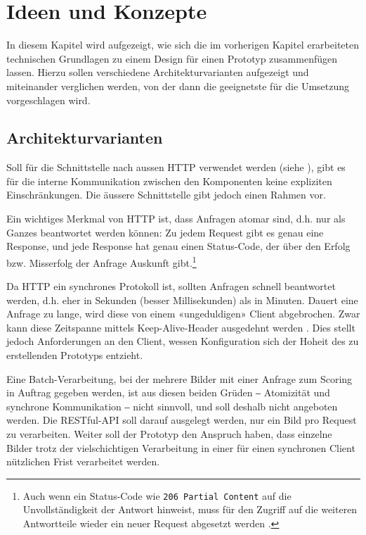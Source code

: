 \section{Ideen und Konzepte}
\label{sec:ideen-und-konzepte}

In diesem Kapitel wird aufgezeigt, wie sich die im vorherigen Kapitel erarbeiteten technischen Grundlagen zu einem Design für einen Prototyp zusammenfügen lassen. Hierzu sollen verschiedene Architekturvarianten aufgezeigt und miteinander verglichen werden, von der dann die geeignetste für die Umsetzung vorgeschlagen wird.

\subsection{Architekturvarianten}
\label{sec:architekturvarianten}

Soll für die Schnittstelle nach aussen HTTP verwendet werden (siehe ), gibt es für die interne Kommunikation zwischen den Komponenten keine expliziten Einschränkungen. Die äussere Schnittstelle gibt jedoch einen Rahmen vor.

Ein wichtiges Merkmal von HTTP ist, dass Anfragen atomar sind, d.h. nur als Ganzes beantwortet werden können: Zu jedem Request gibt es genau eine Response, und jede Response hat genau einen Status-Code, der über den Erfolg bzw. Misserfolg der Anfrage Auskunft gibt.\footnote{Auch wenn ein Status-Code wie \texttt{206 Partial Content} auf die Unvollständigkeit der Antwort hinweist, muss für den Zugriff auf die weiteren Antwortteile wieder ein neuer Request abgesetzt werden \cite[Kapitel 4.1]{RFC7233}.}

Da HTTP ein synchrones Protokoll ist, sollten Anfragen schnell beantwortet werden, d.h. eher in Sekunden (besser Millisekunden) als in Minuten. Dauert eine Anfrage zu lange, wird diese von einem «ungeduldigen» Client abgebrochen. Zwar kann diese Zeitspanne mittels Keep-Alive-Header ausgedehnt werden \cite[Anhang 1.2]{RFC7230}. Dies stellt jedoch Anforderungen an den Client, wessen Konfiguration sich der Hoheit des zu erstellenden Prototyps entzieht.

Eine Batch-Verarbeitung, bei der mehrere Bilder mit einer Anfrage zum Scoring in Auftrag gegeben werden, ist aus diesen beiden Grüden ‒ Atomizität und synchrone Kommunikation ‒ nicht sinnvoll, und soll deshalb nicht angeboten werden. Die RESTful-API soll darauf ausgelegt werden, nur ein Bild pro Request zu verarbeiten. Weiter soll der Prototyp den Anspruch haben, dass einzelne Bilder trotz der vielschichtigen Verarbeitung in einer für einen synchronen Client nützlichen Frist verarbeitet werden.

